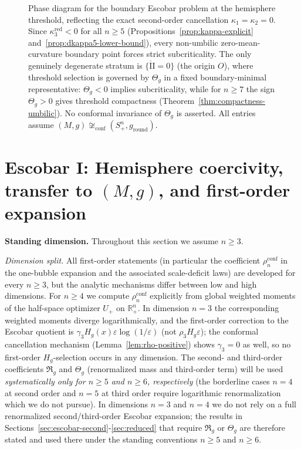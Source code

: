 \documentclass[11pt,reqno,a4paper]{amsart}
\newcommand{\R}{\mathbb{R}}
\numberwithin{equation}{section}
\theoremstyle{plain}
\theoremstyle{remark}
\theoremstyle{plain}
\begin{document}
\begin{figure}[t]
\caption{Phase diagram for the boundary Escobar problem at the hemisphere threshold,
reflecting the exact second-order cancellation $\kappa_1=\kappa_2=0$.
Since $\kappa_3^{\mathrm{red}}<0$ for all $n\ge5$
(Propositions~\ref{prop:kappa-explicit} and~\ref{prop:dkappa5-lower-bound}),
every non-umbilic zero-mean-curvature boundary point forces strict subcriticality.
The only genuinely degenerate stratum is $\{\mathring{\mathrm{II}}=0\}$
(the origin $O$), where threshold selection is governed by $\Theta_g$
in a fixed boundary-minimal representative:
$\Theta_g<0$ implies subcriticality, while for $n\ge7$ the sign $\Theta_g>0$ gives
threshold compactness (Theorem~\ref{thm:compactness-umbilic}).
No conformal invariance of $\Theta_g$ is asserted.
All entries assume $(M,g)\not\cong_{\mathrm{conf}}(S^n_+,g_{\mathrm{round}})$.}
\label{fig:phase-diagram-escobar}
\end{figure}


\section{Escobar I: Hemisphere coercivity, transfer to \texorpdfstring{$(M,g)$}{(M,g)}, and first-order expansion}
\label{sec:escobar}

\medskip
\noindent\textbf{Standing dimension.} Throughout this section we assume $n\ge 3$.

\medskip
\noindent\emph{Dimension split.}
All first-order statements (in particular the coefficient $\rho_n^{\mathrm{conf}}$ in the
one-bubble expansion and the associated scale-deficit laws) are developed for every $n\ge 3$,
but the analytic mechanisms differ between low and high dimensions.
For $n\ge 4$ we compute $\rho_n^{\mathrm{conf}}$ explicitly from global weighted moments of the
half-space optimizer $U_+$ on $\R^n_+$. In dimension $n=3$ the corresponding weighted moments
diverge logarithmically, and the first-order correction to the Escobar quotient is
$\gamma_3H_g(x)\varepsilon\log(1/\varepsilon)$ (not $\rho_3H_g\varepsilon$);
the conformal cancellation mechanism (Lemma~\ref{lem:rho-positive}) shows
$\gamma_3=0$ as well, so no first-order $H_g$-selection occurs in any dimension.
The second- and third-order coefficients $\mathfrak R_g$ and $\Theta_g$ (renormalized mass
and third-order term) will be used \emph{systematically only for $n\ge 5$ and $n\ge 6$, respectively}
(the borderline cases $n=4$ at second order and $n=5$ at third order require logarithmic renormalization
which we do not pursue). In dimensions $n=3$ and $n=4$
we do not rely on a full renormalized second/third-order Escobar expansion; the results in
Sections~\ref{sec:escobar-second}-\ref{sec:reduced} that require $\mathfrak R_g$ or
$\Theta_g$ are therefore stated and used there under the standing conventions $n\ge 5$ and $n\ge6$.
\end{document}
